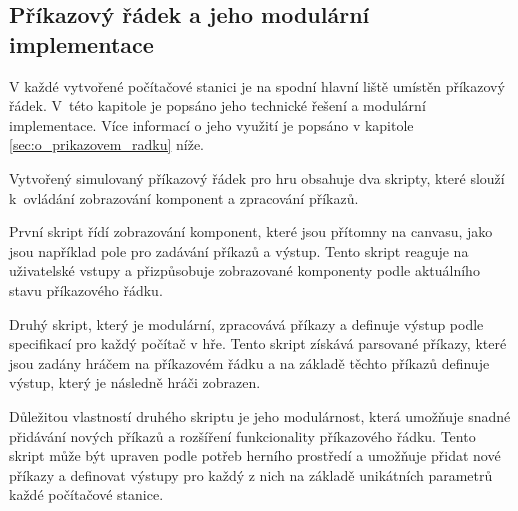 \subsection{Příkazový řádek a jeho modulární implementace}

V každé vytvořené počítačové stanici je na spodní hlavní liště umístěn příkazový řádek. V~této kapitole je popsáno jeho technické řešení a modulární implementace. Více informací o jeho využití je popsáno v kapitole \ref{sec:o_prikazovem_radku} níže.

Vytvořený simulovaný příkazový řádek pro hru obsahuje dva skripty, které slouží k~ovládání zobrazování komponent a zpracování příkazů.

První skript řídí zobrazování komponent, které jsou přítomny na canvasu, jako jsou například pole pro zadávání příkazů a výstup. Tento skript reaguje na uživatelské vstupy a přizpůsobuje zobrazované komponenty podle aktuálního stavu příkazového řádku.

Druhý skript, který je modulární, zpracovává příkazy a definuje výstup podle specifikací pro každý počítač v hře. Tento skript získává parsované příkazy, které jsou zadány hráčem na příkazovém řádku a na základě těchto příkazů definuje výstup, který je následně hráči zobrazen.

Důležitou vlastností druhého skriptu je jeho modulárnost, která umožňuje snadné přidávání nových příkazů a rozšíření funkcionality příkazového řádku. Tento skript může být upraven podle potřeb herního prostředí a umožňuje přidat nové příkazy a definovat výstupy pro každý z nich na základě unikátních parametrů každé počítačové stanice.